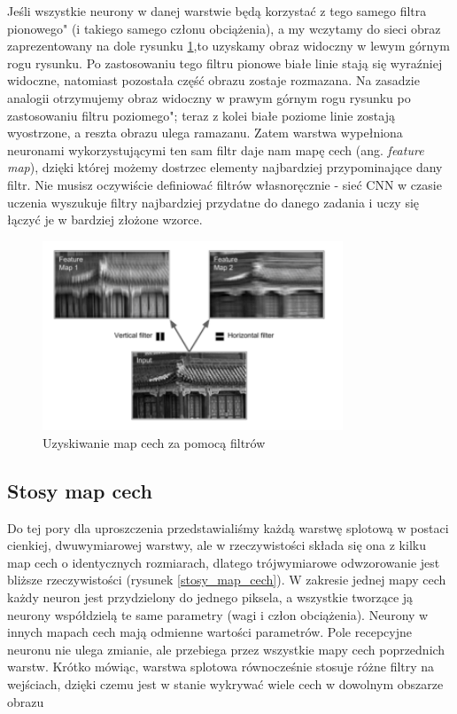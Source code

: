 \documentclass{article}
\begin{document}
Jeśli wszystkie neurony w danej warstwie będą korzystać z tego samego filtra pionowego" (i takiego samego członu obciążenia), a my wczytamy do sieci obraz zaprezentowany na dole rysunku \ref{filters},to uzyskamy obraz widoczny w lewym górnym rogu rysunku. Po zastosowaniu tego filtru pionowe białe linie stają się wyraźniej widoczne, natomiast pozostała część obrazu zostaje rozmazana. Na zasadzie analogii otrzymujemy obraz widoczny w prawym górnym rogu rysunku po zastosowaniu filtru poziomego"; teraz z kolei białe poziome linie zostają wyostrzone, a reszta obrazu ulega ramazanu. Zatem warstwa wypełniona neuronami wykorzystującymi ten sam filtr daje nam mapę cech (ang. \textit{feature map}), dzięki której możemy dostrzec elementy najbardziej przypominające dany filtr. Nie musisz oczywiście definiować filtrów własnoręcznie - sieć CNN w czasie uczenia wyszukuje filtry najbardziej przydatne do danego zadania i uczy się łączyć je w bardziej złożone
wzorce. \cite{geron}
\begin{figure}[H]
	\centering
	\includegraphics[width=0.8\textwidth,keepaspectratio=true]{filters}
	\caption{Uzyskiwanie map cech za pomocą filtrów \cite{geron}}
	\label{filters}
\end{figure}

\subsection{Stosy map cech}
Do tej pory dla uproszczenia przedstawialiśmy każdą warstwę splotową w postaci cienkiej, dwuwymiarowej warstwy, ale w rzeczywistości składa się ona z kilku map cech o identycznych rozmiarach, dlatego trójwymiarowe odwzorowanie jest bliższe rzeczywistości (rysunek \ref{stosy_map_cech}). W zakresie jednej mapy cech każdy neuron jest przydzielony do jednego piksela, a wszystkie tworzące ją neurony współdzielą te same parametry (wagi i człon obciążenia). Neurony w innych mapach cech mają odmienne wartości parametrów. Pole recepcyjne neuronu nie ulega zmianie, ale przebiega przez wszystkie mapy cech poprzednich warstw. Krótko mówiąc, warstwa splotowa równocześnie stosuje różne filtry na wejściach, dzięki czemu jest w stanie wykrywać wiele cech w dowolnym obszarze obrazu \cite{geron}
\end{document}
